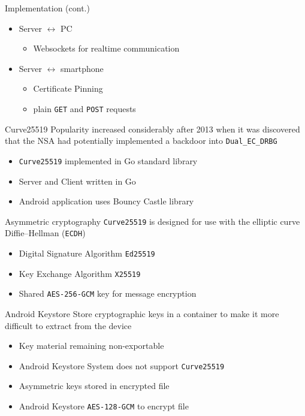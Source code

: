 \documentclass[aspectratio=169]{beamer}
\newcommand{\cipher}[1]{\texttt{#1}}
\begin{document}
  \begin{frame}{Implementation (cont.)}
    \begin{itemize}
      \item Server $\leftrightarrow$ PC
      \begin{itemize}
        \item Websockets for realtime communication
      \end{itemize}
      \item Server $\leftrightarrow$ smartphone
      \begin{itemize}
        \item Certificate Pinning
        \item plain \texttt{GET} and \texttt{POST} requests
      \end{itemize}
    \end{itemize}
  \end{frame}

  \begin{frame}{Curve25519}
    Popularity increased considerably after 2013 when it was discovered that the NSA had potentially implemented a backdoor into \texttt{Dual\_EC\_DRBG}
    \begin{itemize}
      \item \texttt{Curve25519} implemented in Go standard library
      \item Server and Client written in Go
      \item Android application uses Bouncy Castle library
    \end{itemize}
  \end{frame}

  \begin{frame}{Asymmetric cryptography}
    \cipher{Curve25519} is designed for use with the elliptic curve Diffie–Hellman (\texttt{ECDH})
    \begin{itemize}
      \item Digital Signature Algorithm \cipher{Ed25519}
      \item Key Exchange Algorithm \cipher{X25519}
      \item Shared \cipher{AES-256-GCM} key for message encryption
    \end{itemize}
  \end{frame}

  \begin{frame}{Android Keystore}
    Store cryptographic keys in a container to make it more difficult to extract from the device
    \begin{itemize}
      \item Key material remaining non-exportable
      \item Android Keystore System does not support \cipher{Curve25519}
      \item Asymmetric keys stored in encrypted file
      \item Android Keystore \cipher{AES-128-GCM} to encrypt file
    \end{itemize}
  \end{frame}
\end{document}
